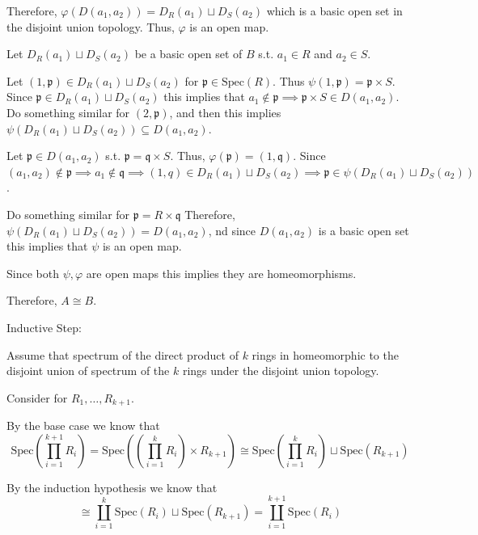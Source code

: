 \documentclass[12pt, letterpaper]{article}
\newcommand{\p}{\mathfrak{p}}
\renewcommand{\t}[1]{\text{#1}}
\newcommand{\Spec}{\t{Spec}}
\begin{document}
\begin{problemproof}
    Therefore, $\varphi(D(a_1,a_2))= D_R(a_1) \sqcup D_S(a_2)$ which is a basic open set in the disjoint union topology. Thus, $\varphi$ is an open map.

    Let $D_R(a_1) \sqcup D_S(a_2)$ be a basic open set of $B$ s.t. $a_1 \in R$ and $a_2 \in S$.

    Let $(1,\p) \in D_R(a_1) \sqcup D_S(a_2)$ for $\p \in \t{Spec}(R)$. Thus $\psi(1,\p)=\p \times S$. Since $\p \in D_R(a_1) \sqcup D_S(a_2)$ this implies that $a_1 \notin \p \implies \p \times S \in D(a_1,a_2)$.
    Do something similar for $(2,\p)$, and then this implies $\psi(D_R(a_1) \sqcup D_S(a_2)) \subseteq D(a_1,a_2)$.

    Let $\p \in D(a_1,a_2)$ s.t. $\p=\mathfrak{q} \times S$. Thus, $\varphi(\p)=(1,\mathfrak{q})$. Since $(a_1,a_2) \notin \p \implies a_1 \notin \mathfrak{q} \implies (1,q) \in D_R(a_1) \sqcup D_S(a_2) \implies \p \in \psi(D_R(a_1) \sqcup D_S(a_2))$.

    Do something similar for $\p = R \times \mathfrak{q}$ Therefore, $\psi(D_R(a_1) \sqcup D_S(a_2))=D(a_1,a_2)$, nd since $D(a_1,a_2)$ is a basic open set this implies that $\psi$ is an open map.

    Since both $\psi,\varphi$ are open maps this implies they are homeomorphisms.

    Therefore, $A \cong B$.

    Inductive Step: 
    
    Assume that spectrum of the direct product of $k$ rings in homeomorphic to the disjoint union of spectrum of the $k$ rings under the disjoint union topology.

    Consider for $R_1,\dots,R_{k+1}$.

    By the base case we know that
    \[\Spec\left( \prod_{i=1}^{k+1}R_i \right)=\Spec\left( \left( \prod_{i=1}^k R_i  \right)\times R_{k+1} \right) 
    \cong \Spec\left( \prod_{i=1}^k R_i \right) \sqcup \Spec(R_{k+1})\]

    By the induction hypothesis we know that
    \[\cong \coprod_{i=1}^{k} \Spec(R_i) \sqcup \Spec(R_{k+1}) = \coprod_{i=1}^{k+1} \Spec(R_i)\]
\end{problemproof}
\end{document}
